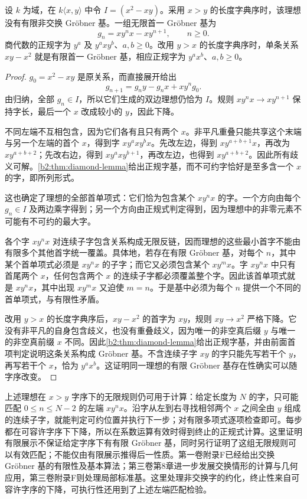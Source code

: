 \begin{proposition}\label{b2:exm:infinite-noncommutative-groebner}
	设 \(k\) 为域，在 \(k\langle x,y\rangle\) 中令 \(I=(x^2-xy)\)。采用 \(x>y\) 的长度字典序时，该理想没有有限非交换 Gröbner 基。一组无限首一 Gröbner 基为
	\[
		g_n=xy^nx-xy^{n+1},\qquad n\ge0.
	\]
	商代数的正规字为 \(y^a\) 及 \(y^axy^b\)、\(a,b\ge0\)。改用 \(y>x\) 的长度字典序时，单条关系 \(xy-x^2\) 就是有限首一 Gröbner 基，相应正规字为 \(y^ax^b\)、\(a,b\ge0\)。
\end{proposition}
\begin{proof}
	\(g_0=x^2-xy\) 是原关系，而直接展开给出
	\[
		g_{n+1}=g_ny-g_nx+xy^n g_0.
	\]
	由归纳，全部 \(g_n\in I\)，所以它们生成的双边理想仍恰为 \(I\)。规则 \(xy^nx\to xy^{n+1}\) 保持字长，最后一个 \(x\) 改成较小的 \(y\)，因此下降。

	不同左端不互相包含，因为它们各有且只有两个 \(x\)。非平凡重叠只能共享这个末端与另一个左端的首个 \(x\)，得到字 \(xy^axy^bx\)。先改左边，得到 \(xy^{a+b+1}x\)，再改为 \(xy^{a+b+2}\)；先改右边，得到 \(xy^axy^{b+1}\)，再改左边，也得到 \(xy^{a+b+2}\)。因此所有歧义可解。\cref{b2:thm:diamond-lemma}给出正规字基，而不可约字恰好是至多含一个 \(x\) 的字，即所列形式。

	这也确定了理想的全部首单项式：它们恰为包含某个 \(xy^nx\) 的字。一个方向由每个 \(g_n\in I\) 及两边乘字得到；另一个方向由正规式判定得到，因为理想中的非零元素不可能有不可约的最大字。

	各个字 \(xy^nx\) 对连续子字包含关系构成无限反链，因而理想的这些最小首字不能由有限多个其他首字统一覆盖。具体地，若存在有限 Gröbner 基，对每个 \(n\)，其中某个首单项式必须是 \(xy^nx\) 的子字；而它又必须包含某个 \(xy^mx\)。字 \(xy^nx\) 中只有首尾两个 \(x\)，任何包含两个 \(x\) 的连续子字都必须覆盖整个字。因此该首单项式就是 \(xy^nx\)，其中出现 \(xy^mx\) 又迫使 \(m=n\)。于是基中必须为每个 \(n\) 提供一个不同的首单项式，与有限性矛盾。

	改用 \(y>x\) 的长度字典序后，\(xy-x^2\) 的首字为 \(xy\)，规则 \(xy\to x^2\) 严格下降。它没有非平凡的自身包含歧义，也没有重叠歧义，因为唯一的非空真后缀 \(y\) 与唯一的非空真前缀 \(x\) 不同。因此\cref{b2:thm:diamond-lemma}给出正规字基，并由前面首项判定说明这条关系构成 Gröbner 基。不含连续子字 \(xy\) 的字只能先写若干个 \(y\)，再写若干个 \(x\)，恰为 \(y^ax^b\)。这证明同一理想的有限 Gröbner 基存在性确实可以随字序改变。
\end{proof}

上述理想在 \(x>y\) 字序下的无限规则仍可用于计算：给定长度为 \(N\) 的字，只可能匹配 \(0\le n\le N-2\) 的左端 \(xy^nx\)。沿字从左到右寻找相邻两个 \(x\) 之间全由 \(y\) 组成的连续子字，就能判定可约位置并执行下一步；对有限多项式逐项检查即可。每步都在可容许字序下下降，所以在系数运算有效时得到终止的正规式计算。这里证明有限展示不保证给定字序下有有限 Gröbner 基，同时另行证明了这组无限规则可以有效匹配；不能仅由有限展示推得后一性质。第一卷附录F已经给出交换 Gröbner 基的有限性及基本算法；第三卷第8章进一步发展交换情形的计算与几何应用，第三卷附录F则处理局部标准基。这里处理非交换字的约化，终止性来自可容许字序的下降，可执行性还用到了上述左端匹配检验。

